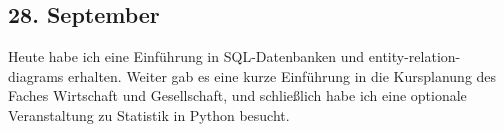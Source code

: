 \subsection{28. September}
Heute habe ich eine Einführung in SQL-Datenbanken und entity-relation-diagrams erhalten. Weiter gab es eine kurze Einführung in die Kursplanung des Faches Wirtschaft und Gesellschaft, und schließlich habe ich eine optionale Veranstaltung zu Statistik in Python besucht.